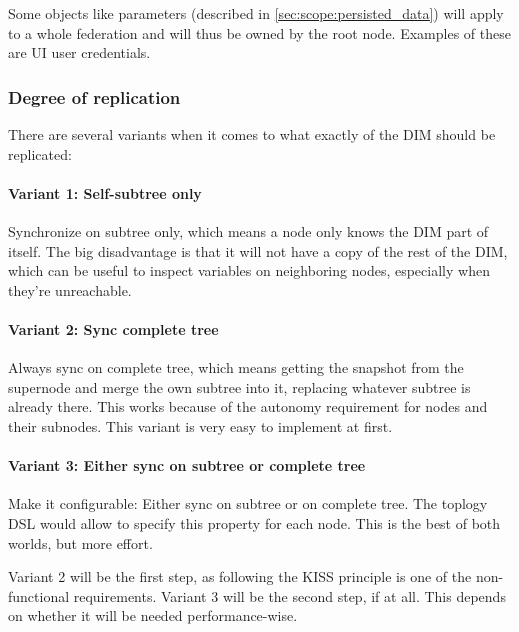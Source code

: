 Some objects like parameters (described in \autoref{sec:scope:persisted_data})
will apply to a whole federation and will thus be owned by the root node.
Examples of these are UI user credentials.

\subsubsection{Degree of replication}
There are several variants when it comes to what exactly of the DIM should be replicated:

\paragraph{Variant 1: Self-subtree only}
Synchronize on subtree only, which means a node only knows the DIM part of
itself. The big disadvantage is that it will not have a copy of the rest of the
DIM, which can be useful to inspect variables on neighboring nodes, especially
when they're unreachable.


\paragraph{Variant 2: Sync complete tree}\label{par:approach:dim:var2}
Always sync on complete tree, which means getting the snapshot from the
supernode and merge the own subtree into it, replacing whatever subtree is
already there. This works because of the autonomy requirement for nodes and
their subnodes. This variant is very easy to implement at first.

\paragraph{Variant 3: Either sync on subtree or complete tree}
Make it configurable: Either sync on subtree or on complete tree. The
toplogy DSL would allow to specify this property for each node. This is
the best of both worlds, but more effort.

Variant 2 will be the first step, as following the \gls{KISS} principle is one
of the non-functional requirements. Variant 3 will be the second step, if at
all. This depends on whether it will be needed performance-wise.

